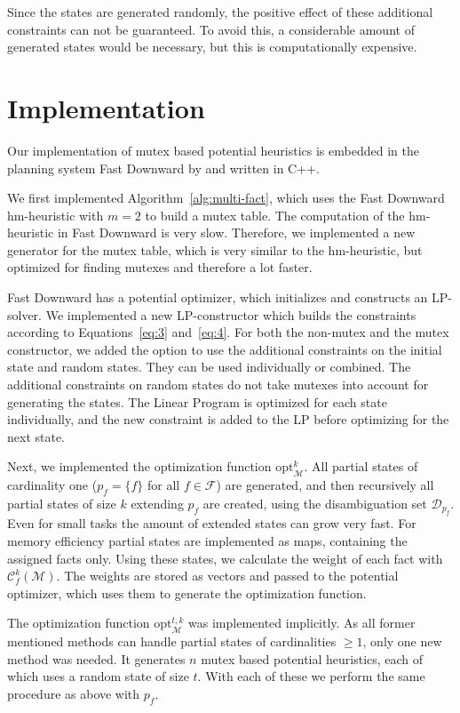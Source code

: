 Since the states are generated randomly, the positive effect of these additional constraints can not be guaranteed.
To avoid this, a considerable amount of generated states would be necessary, but this is computationally expensive.


\section{Implementation}\label{sec:implementation}
Our implementation of mutex based potential heuristics is embedded in the planning system Fast Downward by \citeauthor{helmert2006fast} and written in C++.

We first implemented Algorithm~\ref{alg:multi-fact}, which uses the Fast Downward hm-heuristic with $m=2$ to build a mutex table.
The computation of the hm-heuristic in Fast Downward is very slow.
Therefore, we implemented a new generator for the mutex table, which is very similar to the hm-heuristic, but optimized for finding mutexes and therefore a lot faster.

Fast Downward has a potential optimizer, which initializes and constructs an LP-solver.
We implemented a new LP-constructor which builds the constraints according to Equations~\eqref{eq:3} and~\eqref{eq:4}.
For both the non-mutex and the mutex constructor, we added the option to use the additional constraints on the initial state and random states.
They can be used individually or combined.
The additional constraints on random states do not take mutexes into account for generating the states.
The Linear Program is optimized for each state individually, and the new constraint is added to the LP before optimizing for the next state.

Next, we implemented the optimization function $\mathrm{opt}^k_\mathcal{M}$.
All partial states of cardinality one ($p_f = \{f\}$ for all $f\in\mathcal{F}$) are generated, and then recursively all partial states of size $k$ extending $p_f$ are created, using the disambiguation set $\mathcal{D}_{p_f}$.
Even for small tasks the amount of extended states can grow very fast.
For memory efficiency partial states are implemented as maps, containing the assigned facts only.
Using these states, we calculate the weight of each fact with $\mathcal{C}_f^k(\mathcal{M})$.
The weights are stored as vectors and passed to the potential optimizer, which uses them to generate the optimization function.

The optimization function $\mathrm{opt}^{t,k}_\mathcal{M}$ was implemented implicitly.
As all former mentioned methods can handle partial states of cardinalities $\geq 1$, only one new method was needed.
It generates $n$ mutex based potential heuristics, each of which uses a random state of size $t$.
With each of these we perform the same procedure as above with $p_f$.

